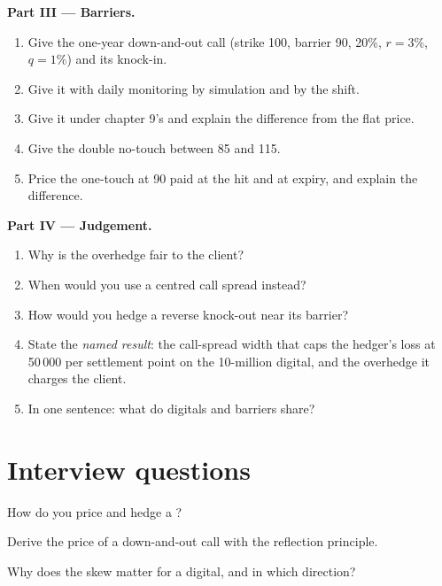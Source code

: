 \begin{problem}
\medskip\noindent\textbf{Part III --- Barriers.}
\begin{enumerate}[resume]
\item Give the one-year down-and-out call (strike 100, barrier 90, 20\%, $r=3\%$, $q=1\%$) and its knock-in.
\item Give it with daily monitoring by simulation and by the shift.
\item Give it under chapter 9's  and explain the difference from the flat price.
\item Give the double no-touch between 85 and 115.
\item Price the one-touch at 90 paid at the hit and at expiry, and explain the difference.
\end{enumerate}

\medskip\noindent\textbf{Part IV --- Judgement.}
\begin{enumerate}[resume]
\item Why is the overhedge fair to the client?
\item When would you use a centred call spread instead?
\item How would you hedge a reverse knock-out near its barrier?
\item State the \emph{named result}: the call-spread width that caps the hedger's loss at 50\,000 per settlement point on
the 10-million digital, and the overhedge it charges the client.
\item In one sentence: what do digitals and barriers share?
\end{enumerate}
\end{problem}

\section{Interview questions}

\begin{interviewq}\label{iq:dv:barriers-and-digitals:1}
How do you price and hedge a ?
\end{interviewq}

\begin{interviewq}\label{iq:dv:barriers-and-digitals:2}
Derive the price of a down-and-out call with the reflection principle.
\end{interviewq}

\begin{interviewq}\label{iq:dv:barriers-and-digitals:3}
Why does the skew matter for a digital, and in which direction?
\end{interviewq}

